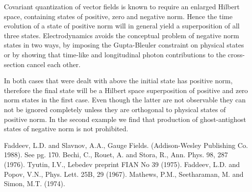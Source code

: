 \documentclass[a4paper,12pt]{article}
\begin{document}
Covariant quantization of vector fields is known to require an enlarged Hilbert space, containing states of positive, zero and negative norm\cite{mss}. Hence the time evolution of a state of positive norm will in general yield a superposition of all three states.  Electrodynamics avoids the conceptual problem of negative norm states in two ways, by imposing the Gupta-Bleuler constraint on physical states or by showing that time-like and longitudinal photon contributions to the cross-section cancel each other.

In both cases that were dealt with above the initial state has positive norm, therefore the final state will be a Hilbert space superposition of positive and zero norm states in the first case.  Even though the latter are not observable they can not be ignored completely unless they are orthogonal to physical states of positive norm.  In the second example we find that production of ghost-antighost states of negative norm is not prohibited.

\newpage
\begin{thebibliography}{99}
Faddeev, L.D. and Slavnov, A.A., Gauge Fields.  (Addison-Wesley Publishing Co. 1988). See pg. 170.
Bechi, C., Rouet, A. and Stora, R., Ann. Phys. 98, 287 (1976).
Tyutin, I.V., Lebedev preprint FIAN No 39 (1975).
Faddeev, L.D. and Popov, V.N., Phys. Lett. 25B, 29 (1967).
Mathews, P.M., Seetharaman, M. and Simon, M.T. (1974).
\end{thebibliography}
\end{document}
